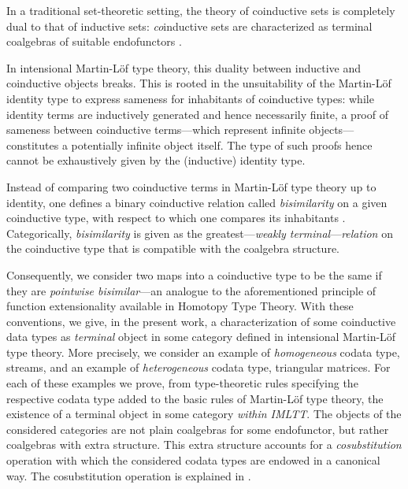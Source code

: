 \documentclass[a4paper,USenglish]{lipics}
\begin{document}
 In a traditional set-theoretic setting, the theory of coinductive sets is completely dual to that of inductive sets:
  \emph{co}inductive sets are characterized as terminal coalgebras of 
 suitable endofunctors \parencite{jacobs1997tutorial}.
 
 In intensional Martin-Löf type theory, this duality between inductive and coinductive objects breaks. This is rooted in the 
 unsuitability of the Martin-Löf identity type to express sameness for inhabitants of coinductive types:
 while identity terms are inductively generated and hence necessarily finite, 
 a proof of sameness between coinductive terms---which represent infinite objects---constitutes a potentially infinite object itself.
 The type of such proofs hence cannot be exhaustively given by the (inductive) identity type.
 
 Instead of comparing two coinductive terms in Martin-Löf type theory up to identity, one defines a 
 binary coinductive relation called \emph{bisimilarity} on a given coinductive type, with respect to which one compares its inhabitants  \parencite{DBLP:conf/types/Coquand93}. 
 Categorically, \emph{bisimilarity} is given as the greatest---\emph{weakly terminal}---\emph{relation} on the coinductive type that is compatible with the coalgebra structure.
 
 Consequently, we consider two maps into a coinductive type to be the same if they are \emph{pointwise bisimilar}---an analogue
 to the aforementioned principle of function extensionality available in Homotopy Type Theory. 
 With these conventions, we give, in the present work, a characterization of some coinductive data types as \emph{terminal} object in some category 
 defined in intensional Martin-L\"of type theory.
 More precisely, we consider an example of \emph{homogeneous} codata type, streams, and 
 an example of \emph{heterogeneous} codata type, triangular matrices.
 For each of these examples we prove, 
 from type-theoretic rules specifying the respective codata type added to the basic rules of Martin-L\"of type theory,
 the existence of a terminal object in some category \emph{within IMLTT}.
 The objects of the considered categories are not plain coalgebras for some endofunctor, but rather coalgebras with extra structure.
 This extra structure accounts for a \emph{cosubstitution} operation with which the considered codata types are endowed in a canonical way.
 The cosubstitution operation is explained in .

\end{document}
